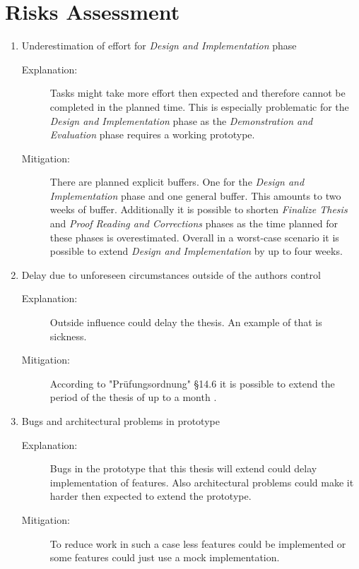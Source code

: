 \section{Risks Assessment}
\label{sec:Organisation:RiskAssessment}

\begin{enumerate}[label=Risk \arabic*:, align=left, leftmargin=*]
    \item Underestimation of effort for \emph{Design and Implementation} phase
        \begin{description}
            \item[Explanation:] Tasks might take more effort then expected and therefore cannot be completed in the planned time. This is especially problematic for the \emph{Design and Implementation} phase as the \emph{Demonstration and Evaluation} phase requires  a working prototype.
            \item[Mitigation:] There are planned explicit buffers. One for the \emph{Design and Implementation} phase and one general buffer. This amounts to two weeks of buffer. Additionally it is possible to shorten \emph{Finalize Thesis} and \emph{Proof Reading and Corrections} phases as the time planned for these phases is overestimated. Overall in a worst-case scenario it is possible to extend \emph{Design and Implementation} by up to four weeks.
        \end{description}
    
    \item Delay due to unforeseen circumstances outside of the authors control
        \begin{description}
            \item[Explanation:] Outside influence could delay the thesis. An example of that is sickness.
            \item[Mitigation:] According to "Prüfungsordnung" §14.6 it is possible to extend the period of the thesis of up to a month \cite[~ p. 724]{StudienUndPrufungsordnung2015}.
        \end{description}

    \item Bugs and architectural problems in prototype
        \begin{description}
            \item[Explanation:] Bugs in the prototype that this thesis will extend could delay implementation of features. Also architectural problems could make it harder then expected to extend the prototype.
            \item[Mitigation:] To reduce work in such a case less features could be implemented or some features could just use a mock implementation.
        \end{description}
\end{enumerate}
